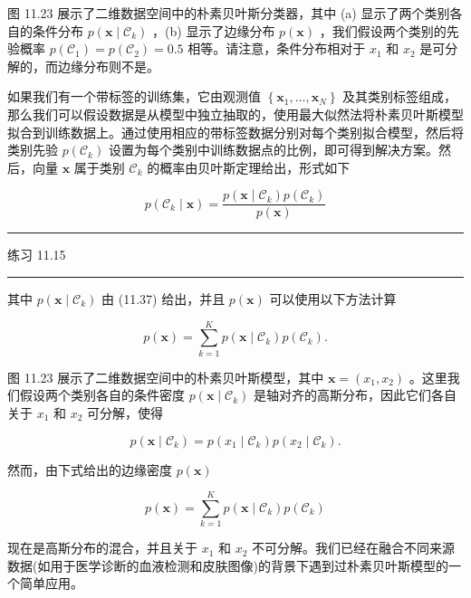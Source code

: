 \documentclass[10pt]{report}
\newcommand{\HRule}{\begin{center}\rule{0.9\linewidth}{0.2mm}\end{center}}
\begin{document}
图 11.23 展示了二维数据空间中的朴素贝叶斯分类器，其中 (a) 显示了两个类别各自的条件分布 \(p\left( {\mathbf{x} \mid  {\mathcal{C}}_{k}}\right)\) ，(b) 显示了边缘分布 \(p\left( \mathbf{x}\right)\) ，我们假设两个类别的先验概率 \(p\left( {\mathcal{C}}_{1}\right)  = p\left( {\mathcal{C}}_{2}\right)  = {0.5}\) 相等。请注意，条件分布相对于 \({x}_{1}\) 和 \({x}_{2}\) 是可分解的，而边缘分布则不是。

如果我们有一个带标签的训练集，它由观测值 \(\left\{  {{\mathbf{x}}_{1},\ldots ,{\mathbf{x}}_{N}}\right\}\) 及其类别标签组成，那么我们可以假设数据是从模型中独立抽取的，使用最大似然法将朴素贝叶斯模型拟合到训练数据上。通过使用相应的带标签数据分别对每个类别拟合模型，然后将类别先验 \(p\left( {\mathcal{C}}_{k}\right)\) 设置为每个类别中训练数据点的比例，即可得到解决方案。然后，向量 \(\mathbf{x}\) 属于类别 \({\mathcal{C}}_{k}\) 的概率由贝叶斯定理给出，形式如下

\[
p\left( {{\mathcal{C}}_{k} \mid  \mathbf{x}}\right)  = \frac{p\left( {\mathbf{x} \mid  {\mathcal{C}}_{k}}\right) p\left( {\mathcal{C}}_{k}\right) }{p\left( \mathbf{x}\right) } \tag{11.38}
\]

\HRule

练习 11.15

\HRule

其中 \(p\left( {\mathbf{x} \mid  {\mathcal{C}}_{k}}\right)\) 由 (11.37) 给出，并且 \(p\left( \mathbf{x}\right)\) 可以使用以下方法计算

\[
p\left( \mathbf{x}\right)  = \mathop{\sum }\limits_{{k = 1}}^{K}p\left( {\mathbf{x} \mid  {\mathcal{C}}_{k}}\right) p\left( {\mathcal{C}}_{k}\right) . \tag{11.39}
\]

图 11.23 展示了二维数据空间中的朴素贝叶斯模型，其中 \(\mathbf{x} = \left( {{x}_{1},{x}_{2}}\right)\) 。这里我们假设两个类别各自的条件密度 \(p\left( {\mathbf{x} \mid  {\mathcal{C}}_{k}}\right)\) 是轴对齐的高斯分布，因此它们各自关于 \({x}_{1}\) 和 \({x}_{2}\) 可分解，使得

\[
p\left( {\mathbf{x} \mid  {\mathcal{C}}_{k}}\right)  = p\left( {{x}_{1} \mid  {\mathcal{C}}_{k}}\right) p\left( {{x}_{2} \mid  {\mathcal{C}}_{k}}\right) . \tag{11.40}
\]

然而，由下式给出的边缘密度 \(p\left( \mathbf{x}\right)\)

\[
p\left( \mathbf{x}\right)  = \mathop{\sum }\limits_{{k = 1}}^{K}p\left( {\mathbf{x} \mid  {\mathcal{C}}_{k}}\right) p\left( {\mathcal{C}}_{k}\right)  \tag{11.41}
\]

现在是高斯分布的混合，并且关于 \({x}_{1}\) 和 \({x}_{2}\) 不可分解。我们已经在融合不同来源数据(如用于医学诊断的血液检测和皮肤图像)的背景下遇到过朴素贝叶斯模型的一个简单应用。
\end{document}
